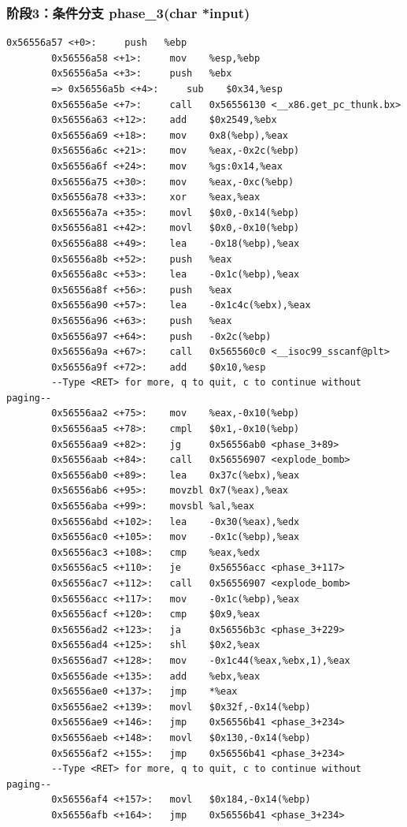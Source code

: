 \documentclass[supercite]{Experimental_Report}
\theoremstyle{definition}
\begin{document}
	\subsubsection{阶段3：条件分支 phase\_3(char *input)}
	\begin{lstlisting}[style=commonCodeStyle, caption={phase2}, label={lst:3-2}]
		0x56556a57 <+0>:     push   %ebp
		0x56556a58 <+1>:     mov    %esp,%ebp
		0x56556a5a <+3>:     push   %ebx
		=> 0x56556a5b <+4>:     sub    $0x34,%esp
		0x56556a5e <+7>:     call   0x56556130 <__x86.get_pc_thunk.bx>
		0x56556a63 <+12>:    add    $0x2549,%ebx
		0x56556a69 <+18>:    mov    0x8(%ebp),%eax
		0x56556a6c <+21>:    mov    %eax,-0x2c(%ebp)
		0x56556a6f <+24>:    mov    %gs:0x14,%eax
		0x56556a75 <+30>:    mov    %eax,-0xc(%ebp)
		0x56556a78 <+33>:    xor    %eax,%eax
		0x56556a7a <+35>:    movl   $0x0,-0x14(%ebp)
		0x56556a81 <+42>:    movl   $0x0,-0x10(%ebp)
		0x56556a88 <+49>:    lea    -0x18(%ebp),%eax
		0x56556a8b <+52>:    push   %eax
		0x56556a8c <+53>:    lea    -0x1c(%ebp),%eax
		0x56556a8f <+56>:    push   %eax
		0x56556a90 <+57>:    lea    -0x1c4c(%ebx),%eax
		0x56556a96 <+63>:    push   %eax
		0x56556a97 <+64>:    push   -0x2c(%ebp)
		0x56556a9a <+67>:    call   0x565560c0 <__isoc99_sscanf@plt>
		0x56556a9f <+72>:    add    $0x10,%esp
		--Type <RET> for more, q to quit, c to continue without paging--
		0x56556aa2 <+75>:    mov    %eax,-0x10(%ebp)
		0x56556aa5 <+78>:    cmpl   $0x1,-0x10(%ebp)
		0x56556aa9 <+82>:    jg     0x56556ab0 <phase_3+89>
		0x56556aab <+84>:    call   0x56556907 <explode_bomb>
		0x56556ab0 <+89>:    lea    0x37c(%ebx),%eax
		0x56556ab6 <+95>:    movzbl 0x7(%eax),%eax
		0x56556aba <+99>:    movsbl %al,%eax
		0x56556abd <+102>:   lea    -0x30(%eax),%edx
		0x56556ac0 <+105>:   mov    -0x1c(%ebp),%eax
		0x56556ac3 <+108>:   cmp    %eax,%edx
		0x56556ac5 <+110>:   je     0x56556acc <phase_3+117>
		0x56556ac7 <+112>:   call   0x56556907 <explode_bomb>
		0x56556acc <+117>:   mov    -0x1c(%ebp),%eax
		0x56556acf <+120>:   cmp    $0x9,%eax
		0x56556ad2 <+123>:   ja     0x56556b3c <phase_3+229>
		0x56556ad4 <+125>:   shl    $0x2,%eax
		0x56556ad7 <+128>:   mov    -0x1c44(%eax,%ebx,1),%eax
		0x56556ade <+135>:   add    %ebx,%eax
		0x56556ae0 <+137>:   jmp    *%eax
		0x56556ae2 <+139>:   movl   $0x32f,-0x14(%ebp)
		0x56556ae9 <+146>:   jmp    0x56556b41 <phase_3+234>
		0x56556aeb <+148>:   movl   $0x130,-0x14(%ebp)
		0x56556af2 <+155>:   jmp    0x56556b41 <phase_3+234>
		--Type <RET> for more, q to quit, c to continue without paging--
		0x56556af4 <+157>:   movl   $0x184,-0x14(%ebp)
		0x56556afb <+164>:   jmp    0x56556b41 <phase_3+234>

\end{lstlisting}
\end{document}
